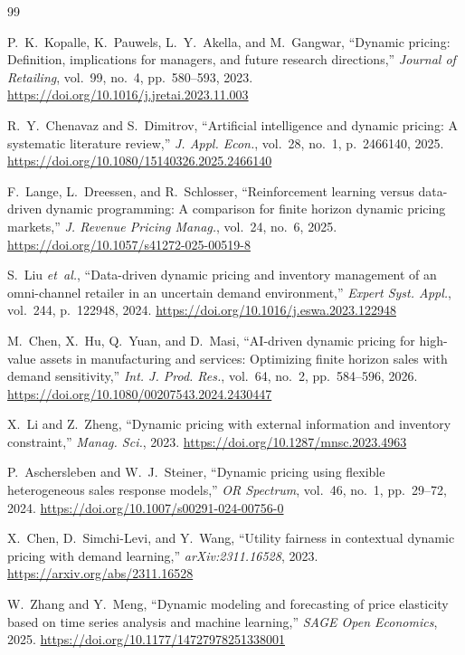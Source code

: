 \documentclass[journal, 10pt, twoside]{IEEEtran}
\begin{document}
\begin{thebibliography}{99}

P.~K.~Kopalle, K.~Pauwels, L.~Y.~Akella, and M.~Gangwar,
``Dynamic pricing: Definition, implications for managers, and future
research directions,''
\textit{Journal of Retailing}, vol.~99, no.~4, pp.~580--593, 2023.
\url{https://doi.org/10.1016/j.jretai.2023.11.003}

R.~Y.~Chenavaz and S.~Dimitrov,
``Artificial intelligence and dynamic pricing: A systematic literature
review,''
\textit{J. Appl. Econ.}, vol.~28, no.~1, p.~2466140, 2025.
\url{https://doi.org/10.1080/15140326.2025.2466140}

F.~Lange, L.~Dreessen, and R.~Schlosser,
``Reinforcement learning versus data-driven dynamic programming: A
comparison for finite horizon dynamic pricing markets,''
\textit{J. Revenue Pricing Manag.}, vol.~24, no.~6, 2025.
\url{https://doi.org/10.1057/s41272-025-00519-8}

S.~Liu \textit{et~al.},
``Data-driven dynamic pricing and inventory management of an omni-channel
retailer in an uncertain demand environment,''
\textit{Expert Syst. Appl.}, vol.~244, p.~122948, 2024.
\url{https://doi.org/10.1016/j.eswa.2023.122948}

M.~Chen, X.~Hu, Q.~Yuan, and D.~Masi,
``AI-driven dynamic pricing for high-value assets in manufacturing and
services: Optimizing finite horizon sales with demand sensitivity,''
\textit{Int. J. Prod. Res.}, vol.~64, no.~2, pp.~584--596, 2026.
\url{https://doi.org/10.1080/00207543.2024.2430447}

X.~Li and Z.~Zheng,
``Dynamic pricing with external information and inventory constraint,''
\textit{Manag. Sci.}, 2023.
\url{https://doi.org/10.1287/mnsc.2023.4963}

P.~Aschersleben and W.~J.~Steiner,
``Dynamic pricing using flexible heterogeneous sales response models,''
\textit{OR Spectrum}, vol.~46, no.~1, pp.~29--72, 2024.
\url{https://doi.org/10.1007/s00291-024-00756-0}

X.~Chen, D.~Simchi-Levi, and Y.~Wang,
``Utility fairness in contextual dynamic pricing with demand learning,''
\textit{arXiv:2311.16528}, 2023.
\url{https://arxiv.org/abs/2311.16528}

W.~Zhang and Y.~Meng,
``Dynamic modeling and forecasting of price elasticity based on time
series analysis and machine learning,''
\textit{SAGE Open Economics}, 2025.
\url{https://doi.org/10.1177/14727978251338001}


\end{thebibliography}
\end{document}
